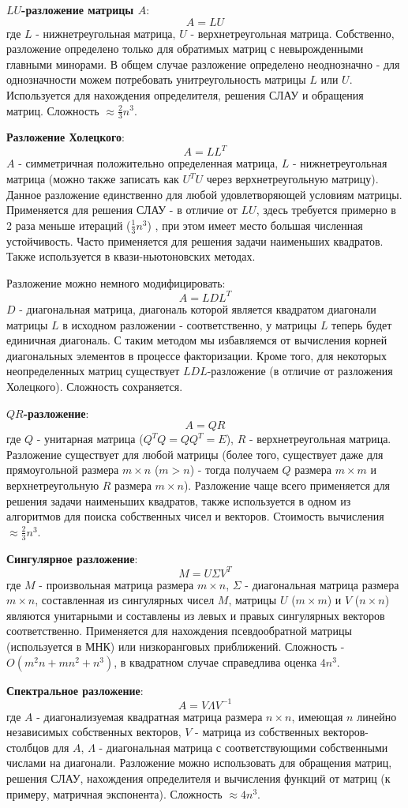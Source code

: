 \textbf{$LU$-разложение матрицы $A$}:
$$ A = LU$$где $L$ - нижнетреугольная матрица, $U$ - верхнетреугольная матрица. Собственно, разложение определено только для обратимых матриц с невырожденными главными минорами. В общем случае разложение определено неоднозначно - для однозначности можем потребовать унитреугольность матрицы $L$ или $U$. Используется для нахождения определителя, решения СЛАУ и обращения матриц. Сложность $\approx \frac{2}{3} n^3$.

\textbf{Разложение Холецкого}:
$$ A = LL^T$$ $A$ - симметричная положительно определенная матрица, $L$ - нижнетреугольная матрица (можно также записать как $U^T U$ через верхнетреугольную матрицу). Данное разложение единственно для любой удовлетворяющей условиям матрицы. Применяется для решения СЛАУ - в отличие от $LU$, здесь требуется примерно в 2 раза меньше итераций ($\frac{1}{3}n^3$) , при этом имеет место большая численная устойчивость. Часто применяется для решения задачи наименьших квадратов. Также используется в квази-ньютоновских методах.

Разложение можно немного модифицировать: $$A = LDL^T$$$D$ - диагональная матрица, диагональ которой является квадратом диагонали матрицы $L$ в исходном разложении - соответственно, у матрицы $L$ теперь будет единичная диагональ. С таким методом мы избавляемся от вычисления корней диагональных элементов в процессе факторизации. Кроме того, для некоторых неопределенных матриц существует $LDL$-разложение (в отличие от разложения Холецкого). Сложность сохраняется.

\textbf{$QR$-разложение}: $$ A = QR$$ где $Q$ - унитарная матрица ($Q^T Q = QQ^T = E$), $R$ - верхнетреугольная матрица. Разложение существует для любой матрицы (более того, существует даже для прямоугольной размера $m \times n$  ($m > n$) - тогда получаем $Q$ размера $m \times m$ и верхнетреугольную $R$ размера $m \times n$). Разложение чаще всего применяется для решения задачи наименьших квадратов, также используется в одном из алгоритмов для поиска собственных чисел и векторов. Стоимость вычисления $\approx \frac{2}{3}n^3$.

\textbf{Сингулярное разложение}:
$$ M = U \Sigma V^T$$ где $M$ - произвольная матрица размера $m \times n$, $\Sigma$ - диагональная матрица размера $m \times n$, составленная из сингулярных чисел $M$, матрицы $U$ ($m \times m$) и $V$ ($n \times n$) являются унитарными и составлены из левых и правых сингулярных векторов соответственно. Применяется для нахождения псевдообратной матрицы (используется в МНК) или низкоранговых приближений. Сложность - $O(m^2n + mn^2 + n^3)$, в квадратном случае справедлива оценка $4n^3$.


\textbf{Спектральное разложение}:
$$A = V \Lambda V^{-1}$$
где $A$ - диагонализуемая квадратная матрица размера $n \times n$, имеющая $n$ линейно независимых собственных векторов, $V$ - матрица из собственных векторов-столбцов для $A$, $\Lambda$ - диагональная матрица с соответствующими собственными числами на диагонали. Разложение можно использовать для обращения матриц, решения СЛАУ, нахождения определителя и вычисления функций от матриц (к примеру, матричная экспонента). Сложность $\approx 4n^3$.
